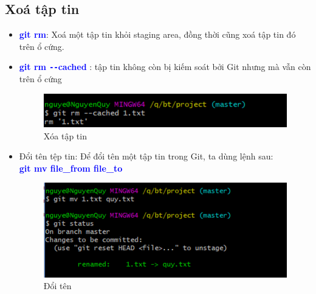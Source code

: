 \documentclass[12pt,a4paper]{report}
\begin{document}
\subsection{Xoá tập tin} 
\begin{itemize}
\item \textcolor{blue}{\bf git rm}: Xoá một tập tin khỏi staging area, đồng thời cũng xoá tập tin đó trên ổ cứng.
\item \textcolor{blue}{\bf git rm \texttt{-{}-}cached} : tập tin không còn bị kiếm soát bởi Git nhưng mà vẫn còn trên ổ cứng

\begin{figure}[!ht]
	\centering
	\includegraphics[width=0.8\linewidth]{screenshot015}
	\caption{Xóa tập tin}
	\label{fig:screenshot015}
	\end{figure}
	
\item Đổi tên tệp tin: Để đổi tên một tập tin trong Git, ta dùng lệnh sau:\\ \textcolor{blue}{\bf git mv file\_from file\_to}

\begin{figure}[!ht]
	\centering
	\includegraphics[width=0.8\linewidth]{screenshot016}
	\caption{Đổi tên}
	\label{fig:screenshot016}
	\end{figure}
\end{itemize}
\end{document}

